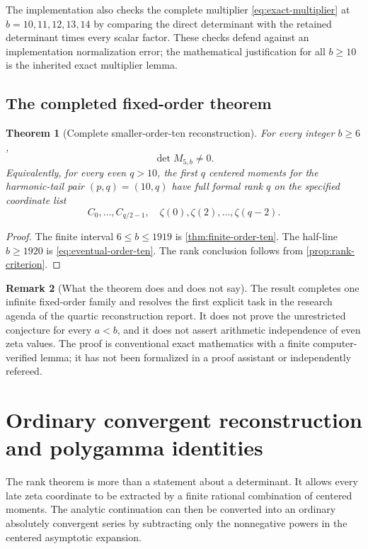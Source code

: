 \documentclass[11pt]{article}
\newtheorem{theorem}{Theorem}[section]
\theoremstyle{definition}
\newtheorem{remark}[theorem]{Remark}
\begin{document}
The implementation also checks the complete multiplier
\eqref{eq:exact-multiplier} at $b=10,11,12,13,14$ by comparing the
direct determinant with the retained determinant times every scalar
factor.  These checks defend against an implementation normalization
error; the mathematical justification for all $b\ge10$ is the inherited
exact multiplier lemma.

\subsection{The completed fixed-order theorem}

\begin{theorem}[Complete smaller-order-ten reconstruction]
\label{thm:complete-order-ten}
For every integer $b\ge6$,
\begin{equation}
 \boxed{\det M_{5,b}\ne0.}
 \label{eq:complete-order-ten}
\end{equation}
Equivalently, for every even $q>10$, the first $q$ centered moments for
the harmonic-tail pair $(p,q)=(10,q)$ have full formal rank $q$ on the
specified coordinate list
\[
 C_0,\ldots,C_{q/2-1},\quad
 \zeta(0),\zeta(2),\ldots,\zeta(q-2).
\]
\end{theorem}

\begin{proof}
The finite interval $6\le b\le1919$ is
\cref{thm:finite-order-ten}.  The half-line $b\ge1920$ is
\eqref{eq:eventual-order-ten}.  The rank conclusion follows from
\cref{prop:rank-criterion}.
\end{proof}

\begin{remark}[What the theorem does and does not say]
The result completes one infinite fixed-order family and resolves the
first explicit task in the research agenda of the quartic reconstruction
report.  It does not prove the unrestricted conjecture for every
$a<b$, and it does not assert arithmetic independence of even zeta
values.  The proof is conventional exact mathematics with a finite
computer-verified lemma; it has not been formalized in a proof assistant
or independently refereed.
\end{remark}
 \section{Ordinary convergent reconstruction and polygamma identities}
\label{sec:ordinary-reconstruction}

The rank theorem is more than a statement about a determinant.  It
allows every late zeta coordinate to be extracted by a finite rational
combination of centered moments.  The analytic continuation can then be
converted into an ordinary absolutely convergent series by subtracting
only the nonnegative powers in the centered asymptotic expansion.
\end{document}
